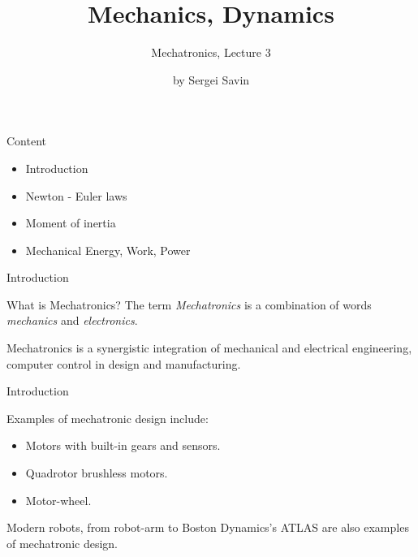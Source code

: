\documentclass{beamer}
\title{Mechanics, Dynamics}
\subtitle{Mechatronics, Lecture 3}
\author{by Sergei Savin}
\date{\mydate}
\begin{document}
\maketitle



\begin{frame}{Content}
\begin{itemize}
\item Introduction
\item Newton - Euler laws
\item Moment of inertia
\item Mechanical Energy, Work, Power
\end{itemize}
\end{frame}


\begin{frame}{Introduction}
	\begin{flushleft}
		
		
		What is Mechatronics? The term \emph{Mechatronics} is a combination of words \emph{mechanics} and \emph{electronics}.
		
		\bigskip
		
		\begin{definition}
			Mechatronics is a synergistic integration of mechanical and electrical engineering, computer control in design and manufacturing. 
		\end{definition}
		
		
	\end{flushleft}
\end{frame}


\begin{frame}{Introduction}
	\begin{flushleft}
		
		
		Examples of mechatronic design include:
		
		\begin{itemize}
			\item Motors with built-in gears and sensors.
			
			\item Quadrotor brushless motors.
			
			\item Motor-wheel.
		\end{itemize}		
	
		\bigskip
		
		Modern robots, from robot-arm to Boston Dynamics's ATLAS are also examples of mechatronic design.
		
		
	\end{flushleft}
\end{frame}
\end{document}
